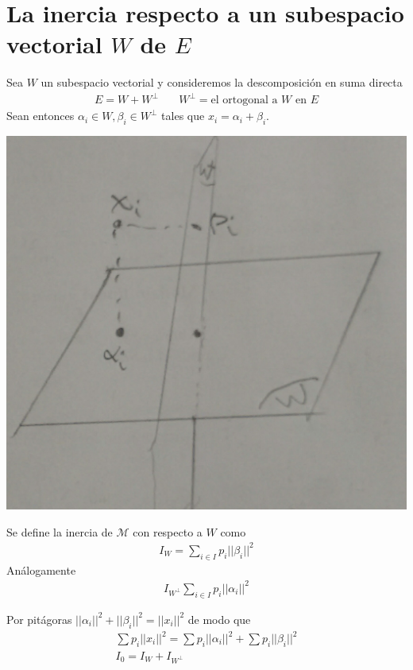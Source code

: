 \documentclass[10pt]{article}
\theoremstyle{plain}
\theoremstyle{definition}
\begin{document}
\section{La inercia respecto a un subespacio vectorial $W$ de $E$}
Sea $W$ un subespacio vectorial y consideremos la descomposición en suma directa
\begin{align*}
E = W + W^{\perp} &\quad W^{\perp} = \text{el ortogonal a $W$ en $E$}
\end{align*}
Sean entonces $\alpha_{i} \in W, \beta_{i} \in W^{\perp}$ tales que $x_{i} = \alpha_{i} + \beta_{i}$.
\begin{center}
\includegraphics[scale=0.1]{imagenes/descomposicionlineal.jpg}
\end{center}
Se define la inercia de $\mathcal{M}$ con respecto a $W$ como
\begin{align*}
I_{W} = \sum_{i \in I} p_{i}||\beta_{i}||^2
\end{align*}
Análogamente
\begin{align*}
I_{W^{\perp}} \sum_{i \in I} p_{i}||\alpha_{i}||^2
\end{align*}

Por pitágoras $||\alpha_{i}||^2 + ||\beta_{i}||^2 = ||x_{i}||^2$ de modo que
\begin{align*}
\sum p_{i} ||x_{i}||^2 = \sum p_{i}||\alpha_{i}||^2 + \sum p_{i} ||\beta_{i}||^2\\
I_{0} = I_{W} + I_{W^{\perp}}
\end{align*}
\end{document}
